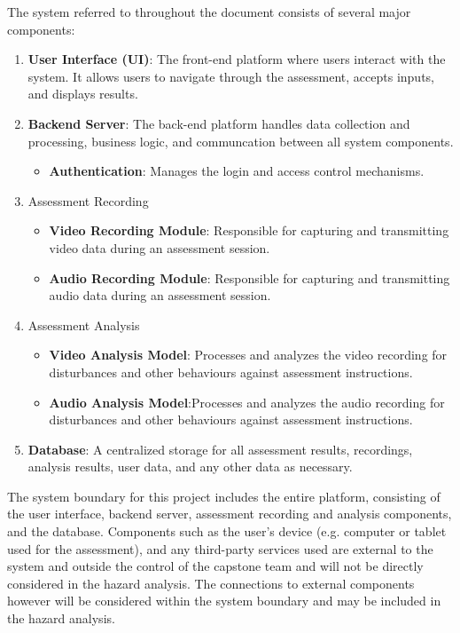\documentclass{article}
\begin{document}
The system referred to throughout the document consists of several major components: 
\begin{enumerate}
    \item \textbf{User Interface (UI)}: The front-end platform where users interact with the system. It allows users to navigate through the assessment, accepts inputs, and displays results.
    \item \textbf{Backend Server}: The back-end platform handles data collection and processing, business logic, and communcation between all system components.
        \begin{itemize}
            \item \textbf{Authentication}: Manages the login and access control mechanisms.
        \end{itemize}
    \item Assessment Recording
        \begin{itemize}
            \item \textbf{Video Recording Module}: Responsible for capturing and transmitting video data during an assessment session.
            \item \textbf{Audio Recording Module}: Responsible for capturing and transmitting audio data during an assessment session.
        \end{itemize}
    \item Assessment Analysis
        \begin{itemize}
            \item \textbf{Video Analysis Model}: Processes and analyzes the video recording for disturbances and other behaviours against assessment instructions.
            \item \textbf{Audio Analysis Model}:Processes and analyzes the audio recording for disturbances and other behaviours against assessment instructions.
        \end{itemize}
    \item \textbf{Database}: A centralized storage for all assessment results, recordings, analysis results, user data, and any other data as necessary.
\end{enumerate}

The system boundary for this project includes the entire platform, consisting of the user interface, backend server, 
assessment recording and analysis components, and the database. Components such as the user's device (e.g. computer or 
tablet used for the assessment), and any third-party services used are external to the system and outside the control of 
the capstone team and will not be directly considered in the hazard analysis. The connections to external components however
will be considered within the system boundary and may be included in the hazard analysis.
\end{document}
